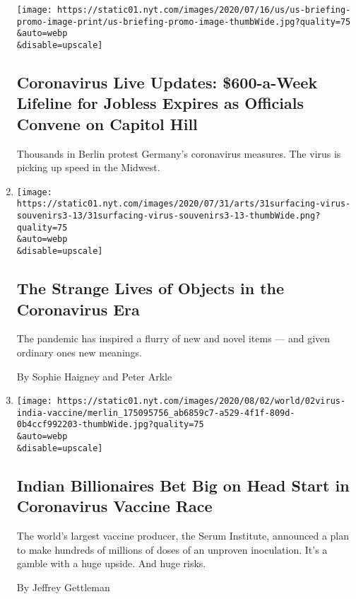 \begin{enumerate}
  \texttt{[image: https://static01.nyt.com/images/2020/07/16/us/us-briefing-promo-image-print/us-briefing-promo-image-thumbWide.jpg?quality=75\\\&auto=webp\\\&disable=upscale]}

  \hypertarget{coronavirus-live-updates-600-a-week-lifeline-for-jobless-expires-as-officials-convene-on-capitol-hill}{%
  \subsection{Coronavirus Live Updates: \$600-a-Week Lifeline for
  Jobless Expires as Officials Convene on Capitol
  Hill}\label{coronavirus-live-updates-600-a-week-lifeline-for-jobless-expires-as-officials-convene-on-capitol-hill}}

  Thousands in Berlin protest Germany's coronavirus measures. The virus
  is picking up speed in the Midwest.
\item
  \href{/2020/08/01/arts/design/virus-design-objects.html}{}

  \texttt{[image: https://static01.nyt.com/images/2020/07/31/arts/31surfacing-virus-souvenirs3-13/31surfacing-virus-souvenirs3-13-thumbWide.png?quality=75\\\&auto=webp\\\&disable=upscale]}

  \hypertarget{the-strange-lives-of-objects-in-the-coronavirus-era}{%
  \subsection{The Strange Lives of Objects in the Coronavirus
  Era}\label{the-strange-lives-of-objects-in-the-coronavirus-era}}

  The pandemic has inspired a flurry of new and novel items --- and
  given ordinary ones new meanings.

  By Sophie Haigney and Peter Arkle
\item
  \href{/2020/08/01/world/asia/coronavirus-vaccine-india.html}{}

  \texttt{[image: https://static01.nyt.com/images/2020/08/02/world/02virus-india-vaccine/merlin\_175095756\_ab6859c7-a529-4f1f-809d-0b4ccf992203-thumbWide.jpg?quality=75\\\&auto=webp\\\&disable=upscale]}

  \hypertarget{indian-billionaires-bet-big-on-head-start-in-coronavirus-vaccine-race}{%
  \subsection{Indian Billionaires Bet Big on Head Start in Coronavirus
  Vaccine
  Race}\label{indian-billionaires-bet-big-on-head-start-in-coronavirus-vaccine-race}}

  The world's largest vaccine producer, the Serum Institute, announced a
  plan to make hundreds of millions of doses of an unproven inoculation.
  It's a gamble with a huge upside. And huge risks.

  By Jeffrey Gettleman
\end{enumerate}

